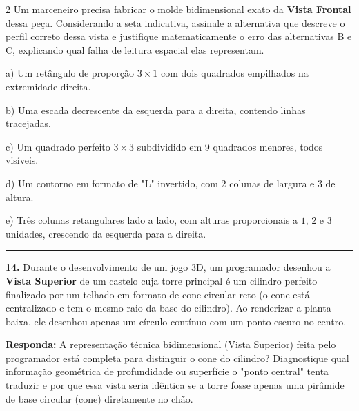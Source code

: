 \documentclass[twoside, 10pt, a4paper]{article}
\begin{document}
\begin{multicols*}{2}
Um marceneiro precisa fabricar o molde bidimensional exato da \textbf{Vista Frontal} dessa peça. Considerando a seta indicativa, assinale a alternativa que descreve o perfil correto dessa vista e justifique matematicamente o erro das alternativas B e C, explicando qual falha de leitura espacial elas representam.

a) Um retângulo de proporção $3 \times 1$ com dois quadrados empilhados na extremidade direita.\par\par\vspace{0.5cm}
b) Uma escada decrescente da esquerda para a direita, contendo linhas tracejadas.\par\par\vspace{0.5cm}
c) Um quadrado perfeito $3 \times 3$ subdividido em 9 quadrados menores, todos visíveis.\par\par\vspace{0.5cm}
d) Um contorno em formato de "L" invertido, com $2$ colunas de largura e $3$ de altura.\par\par\vspace{0.5cm}
e) Três colunas retangulares lado a lado, com alturas proporcionais a $1$, $2$ e $3$ unidades, crescendo da esquerda para a direita.
\par\vspace{0.5cm}

\noindent\textcolor{CorLinha}{\rule{\linewidth}{0.5pt}} 
\par\par\vspace{0.5cm}
\textbf{14.} Durante o desenvolvimento de um jogo 3D, um programador desenhou a \textbf{Vista Superior} de um castelo cuja torre principal é um cilindro perfeito finalizado por um telhado em formato de cone circular reto (o cone está centralizado e tem o mesmo raio da base do cilindro). Ao renderizar a planta baixa, ele desenhou apenas um círculo contínuo com um ponto escuro no centro.
\begin{boxresponda}
\textbf{Responda:} A representação técnica bidimensional (Vista Superior) feita pelo programador está completa para distinguir o cone do cilindro? Diagnostique qual informação geométrica de profundidade ou superfície o "ponto central" tenta traduzir e por que essa vista seria idêntica se a torre fosse apenas uma pirâmide de base circular (cone) diretamente no chão.
\end{boxresponda}
\par\vspace{0.5cm}


\end{multicols*}
\end{document}
